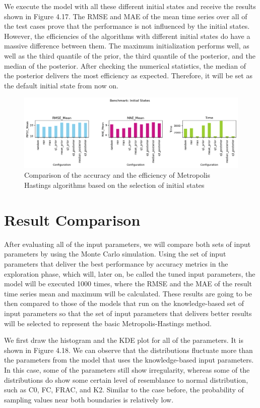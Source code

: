 We execute the model with all these different initial states and receive the results shown in Figure 4.17. The RMSE and MAE of the mean time series over all of the test cases prove that the performance is not influenced by the initial states. However, the efficiencies of the algorithms with different initial states do have a massive difference between them. The maximum initialization performs well, as well as the third quantile of the prior, the third quantile of the posterior, and the median of the posterior. After checking the numerical statistics, the median of the posterior delivers the most efficiency as expected. Therefore, it will be set as the default initial state from now on.

\begin{figure}[H]
    \centering
    \includegraphics[width=1\textwidth]{figures/basic_mh/benchmark/init_method.png}
    \captionsetup{width=.8\textwidth}
    \caption{Comparison of the accuracy and the efficiency of Metropolis Hastings algorithms based on the selection of initial states}
    \label{fig:enter-label}
\end{figure}


\section{Result Comparison}
After evaluating all of the input parameters, we will compare both sets of input parameters by using the Monte Carlo simulation. Using the set of input parameters that deliver the best performance by accuracy metrics in the exploration phase, which will, later on, be called the tuned input parameters, the model will be executed 1000 times, where the RMSE and the MAE of the result time series mean and maximum will be calculated. These results are going to be then compared to those of the models that run on the knowledge-based set of input parameters so that the set of input parameters that delivers better results will be selected to represent the basic Metropolis-Hastings method.

We first draw the histogram and the KDE plot for all of the parameters. It is shown in Figure 4.18. We can observe that the distributions fluctuate more than the parameters from the model that uses the knowledge-based input parameters. In this case, some of the parameters still show irregularity, whereas some of the distributions do show some certain level of resemblance to normal distribution, such as C0, FC, FRAC, and K2. Similar to the case before, the probability of sampling values near both boundaries is relatively low. 

